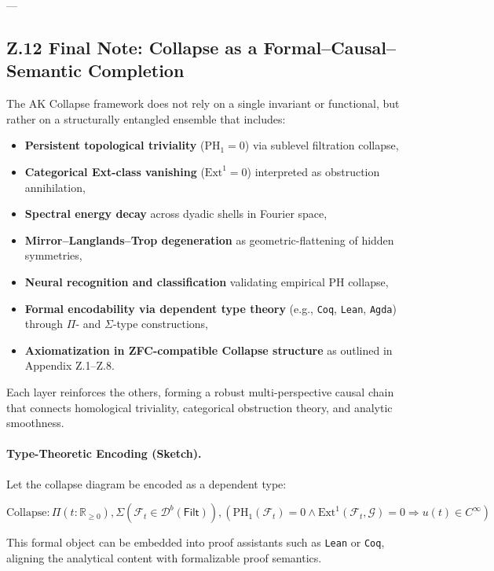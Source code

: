 \documentclass[11pt]{article}
\theoremstyle{definition}
\begin{document}
---

\subsection*{Z.12 Final Note: Collapse as a Formal–Causal–Semantic Completion}

The AK Collapse framework does not rely on a single invariant or functional,  
but rather on a structurally entangled ensemble that includes:

\begin{itemize}
  \item \textbf{Persistent topological triviality} (\( \mathrm{PH}_1 = 0 \)) via sublevel filtration collapse,
  \item \textbf{Categorical Ext-class vanishing} (\( \mathrm{Ext}^1 = 0 \)) interpreted as obstruction annihilation,
  \item \textbf{Spectral energy decay} across dyadic shells in Fourier space,
  \item \textbf{Mirror–Langlands–Trop degeneration} as geometric-flattening of hidden symmetries,
  \item \textbf{Neural recognition and classification} validating empirical PH collapse,
  \item \textbf{Formal encodability via dependent type theory} (e.g., \texttt{Coq}, \texttt{Lean}, \texttt{Agda}) through $\Pi$- and $\Sigma$-type constructions,
  \item \textbf{Axiomatization in ZFC-compatible Collapse structure} as outlined in Appendix Z.1–Z.8.
\end{itemize}

Each layer reinforces the others, forming a robust multi-perspective causal chain  
that connects homological triviality, categorical obstruction theory, and analytic smoothness.

\paragraph{Type-Theoretic Encoding (Sketch).}  
Let the collapse diagram be encoded as a dependent type:

\[
\mathrm{Collapse} : \Pi(t : \mathbb{R}_{\geq 0}), \Sigma(\mathcal{F}_t \in \mathcal{D}^b(\mathsf{Filt})),  
\left( \mathrm{PH}_1(\mathcal{F}_t) = 0 \wedge \mathrm{Ext}^1(\mathcal{F}_t, \mathcal{G}) = 0 \Rightarrow u(t) \in C^\infty \right)
\]

This formal object can be embedded into proof assistants such as \texttt{Lean} or \texttt{Coq},  
aligning the analytical content with formalizable proof semantics.
\end{document}
